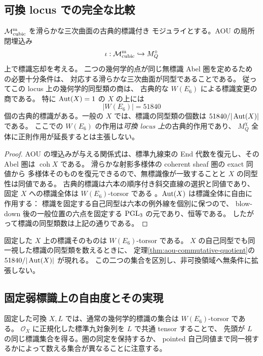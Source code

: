 \subsection{可換 locus での完全な比較}
\begin{theorem}\label{thm:aou-commutative-quotient}
$\mathcal M_{\rm cubic}^{\rm m}$ を滑らかな三次曲面の古典的標識付き
モジュライとする。AOU\cite[Theorem 1.2]{AOU} の局所閉埋込み
\[
 \iota:\mathcal M_{\rm cubic}^{\rm m}\hookrightarrow M_Q^\circ
\]
上で標識忘却を考える。
二つの幾何学的点が同じ無標識 Abel 圏を定めるための必要十分条件は、
対応する滑らかな三次曲面が同型であることである。
従ってこの locus 上の幾何学的同型類の商は、
古典的な $W(E_6)$ による標識変更の商である。
特に $\operatorname{Aut}(X)=1$ の $X$ の上には
\[
 |W(E_6)|=51840
\]
個の古典的標識がある。一般の $X$ では、標識の同型類の個数は
$51840/|\operatorname{Aut}(X)|$ である。
ここでの $W(E_6)$ の作用は\emph{可換 locus 上}の古典的作用であり、
$M_Q^\chi$ 全体に正則作用が延長するとは主張しない。
\end{theorem}
\begin{proof}
AOU の埋込みが与える関係式は、標準九線束の
End 代数を復元し、その Abel 圏は $\operatorname{coh}X$ である。
滑らかな射影多様体の coherent sheaf 圏の exact 同値から
多様体そのものを復元できるので、無標識像が一致することと
$X$ の同型性は同値である\cite{Gabriel}。
古典的標識は六本の順序付き斜交直線の選択と同値であり、
固定 $X$ への標識全体は $W(E_6)$-torsor である
\cite[\S2.3]{AOU}。$\operatorname{Aut}(X)$ は標識全体に自由に作用する：
標識を固定する自己同型は六本の例外線を個別に保つので、
blow-down 後の一般位置の六点を固定する $\operatorname{PGL}_3$ の元であり、恒等である。
したがって標識の同型類数は上記の通りである。
\end{proof}
\begin{remark}[数える集合の違い]
固定した $X$ 上の標識そのものは $W(E_6)$-torsor である。
$X$ の自己同型でも同一視した標識の同型類を数えるときに、
定理\ref{thm:aou-commutative-quotient}の $51840/|\operatorname{Aut}(X)|$ が現れる。
この二つの集合を区別し、非可換領域へ無条件に拡張しない。
\end{remark}


\subsection{固定弱標識上の自由度とその実現}
固定した可換 $X,L$ では、通常の幾何学的標識の集合は $W(E_6)$-torsor である。
$\mathcal O_X$ に正規化した標準九対象列を $L$ で共通 tensor することで、
先頭が $L$ の同じ標識集合を得る。圏の同定を保持するか、
pointed 自己同値まで同一視するかによって数える集合が異なることに注意する。

